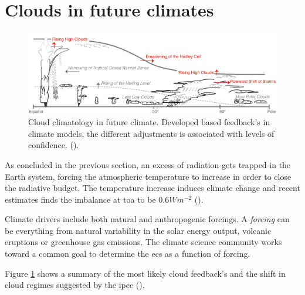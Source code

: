 \section{Clouds in future climates} \label{sec:intro_cloud_future_climates}
\begin{figure}[h]
    \centering
    \includegraphics[scale = 0.8]{Chapter1_Intro/images/Fig7-11_ipcc.jpg}
    \caption{Cloud climatology in future climate. Developed based feedback's in climate models, the different adjustments is associated with levels of confidence.  (\cite{IPCC_CH7_clouds}).}
    \label{fig:cloud_scheme}
\end{figure}
As concluded in the previous section, an excess of radiation gets trapped in the Earth system, forcing the atmospheric temperature to increase in order to close the radiative budget. The temperature increase induces climate change and recent estimates finds the imbalance at \acrshort{toa} to be $0.6 Wm^{-2}$ (\cite{Wild2019TheModels}).

Climate drivers include both natural and anthropogenic forcings. A \textit{forcing} can be everything from natural variability in the solar energy output, volcanic eruptions or greenhouse gas emissions. The climate science community works toward a common goal to determine the \acrshort{ecs} as a function of forcing. %

Figure \ref{fig:cloud_scheme} shows a summary of the most likely cloud feedback's and the shift in cloud regimes suggested by the \acrshort{ipcc} (\cite{IPCC_CH7_clouds}).

